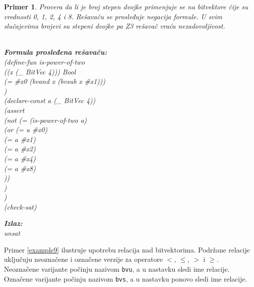 \documentclass[12pt,oneside]{memoir}
\newcommand\tab[1][0.5cm]{\hspace*{#1}}
\newtheorem{primer}{Primer}
\begin{document}
\begin{primer} \label{example8}
Provera da li je broj stepen dvojke primenjuje se na bitvektore čije su vrednosti 0, 1, 2, 4 i 8. Rešavaču se prosleđuje negacija formule. U svim slučajevima brojevi su stepeni dvojke pa Z3 rešavač vraća nezadovoljivost.\\ \\
\begin{minipage}[b]{0.5\textwidth}
\textbf{Formula prosleđena rešavaču:}
\\(define-fun is-power-of-two 
\\\tab((x (\_ BitVec 4))) Bool 
\\\tab(= \#x0 (bvand x (bvsub x \#x1)))
\\)
\\(declare-const a (\_ BitVec 4))
\\(assert 
\\\tab(not (= (is-power-of-two a) 
\\\tab\tab    (or (= a \#x0) 
\\\tab\tab\tab     (= a \#x1) 
\\\tab\tab\tab     (= a \#x2) 
\\\tab\tab\tab     (= a \#x4) 
\\\tab\tab\tab     (= a \#x8)
\\\tab\tab		))
\\\tab )
\\)
\\(check-sat)
\end{minipage}
\hspace{2.5cm}
\begin{minipage}[t]{0.5\textwidth}
\vspace{-10.45cm}
\textbf{Izlaz:}
\\unsat
\end{minipage}
\end{primer}
\par Primer \ref{example9} ilustruje upotrebu relacija nad bitvektorima. Podržane relacije uključuju neoznačene i označene verzije za operatore $<$, $\leq$, $>$ i $\geq$. Neoznačene varijante počinju nazivom \texttt{bvu}, a u nastavku sledi ime relacije. Označene varijante počinju nazivom \texttt{bvs}, a u nastavku ponovo sledi ime relacije. 
\end{document}
